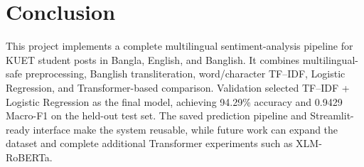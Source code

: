 \documentclass[12pt,a4paper]{report}
\begin{document}
\section{Conclusion}
This project implements a complete multilingual sentiment-analysis pipeline
for KUET student posts in Bangla, English, and Banglish. It combines
multilingual-safe preprocessing, Banglish transliteration, word/character
TF--IDF, Logistic Regression, and Transformer-based comparison. Validation
selected TF--IDF + Logistic Regression as the final model, achieving
94.29\% accuracy and 0.9429 Macro-F1 on the held-out test set. The saved
prediction pipeline and Streamlit-ready interface make the system reusable,
while future work can expand the dataset and complete additional Transformer
experiments such as XLM-RoBERTa.
\end{document}

